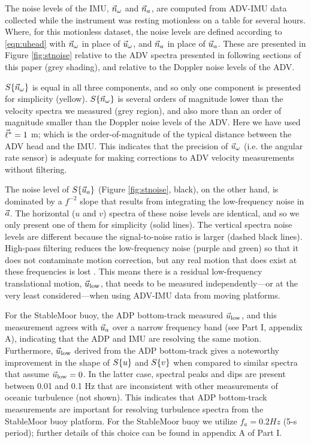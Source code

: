 The noise levels of the IMU, $\vec{n}_{\omega}$ and $\vec{n}_{a}$, are computed from ADV-IMU data collected while the instrument was resting motionless on a table for several hours. Where, for this motionless dataset, the noise levels are defined according to \eqref{eqn:uhead} with $\vec{n}_{\omega}$ in place of $\vec{u}_\omega$, and $\vec{n}_{a}$ in place of $\vec{u}_a$.  These are presented in Figure \ref{fig:stnoise} relative to the ADV spectra presented in following sections of this paper (grey shading), and relative to the Doppler noise levels of the ADV.

$S\{\vec{n}_{\omega}\}$ is equal in all three components, and so only one component is presented for simplicity (yellow). $S\{\vec{n}_{\omega}\}$ is several orders of magnitude lower than the velocity spectra we measured (grey region), and also more than an order of magnitude smaller than the Doppler noise levels of the ADV. Here we have used $\vec{\ell}^*=1$ m; which is the order-of-magnitude of the typical distance between the ADV head and the IMU. This indicates that the precision of $\vec{u}_\omega$ (i.e. the angular rate sensor) is adequate for making corrections to ADV velocity measurements without filtering.

The noise level of $S\{\vec{u}_a\}$ (Figure \ref{fig:stnoise}, black), on the other hand, is dominated by a $f^{-2}$ slope that results from integrating the low-frequency noise in ${\vec{a}}$. The horizontal ($u$ and $v$) spectra of these noise levels are identical, and so we only present one of them for simplicity (solid lines). The vertical spectra noise levels are different because the signal-to-noise ratio is larger (dashed black lines). High-pass filtering reduces the low-frequency noise (purple and green) so that it does not contaminate motion correction, but any real motion that does exist at these frequencies is lost \cite[]{EgelandPhD2014, VanZwieten++2015}. This means there is a residual low-frequency translational motion, $\vec{u}_\mathrm{low}$, that needs to be measured independently---or at the very least considered---when using ADV-IMU data from moving platforms. 

For the StableMoor buoy, the ADP bottom-track measured $\vec{u}_\mathrm{low}$, and this measurement agrees with $\vec{u}_a$ over a narrow frequency band (see Part I, appendix A), indicating that the ADP and IMU are resolving the same motion. Furthermore, $\vec{u}_\mathrm{low}$ derived from the ADP bottom-track gives a noteworthy improvement in the shape of $S\{u\}$ and $S\{v\}$ when compared to similar spectra that assume $\vec{u}_\mathrm{low}=0$. In the latter case, spectral peaks and dips are present between 0.01 and 0.1 Hz that are inconsistent with other measurements of oceanic turbulence (not shown). This indicates that ADP bottom-track measurements are important for resolving turbulence spectra from the StableMoor buoy platform. For the StableMoor buoy we utilize $f_a = 0.2 Hz$ (5-s period); further details of this choice can be found in appendix A of Part I.

